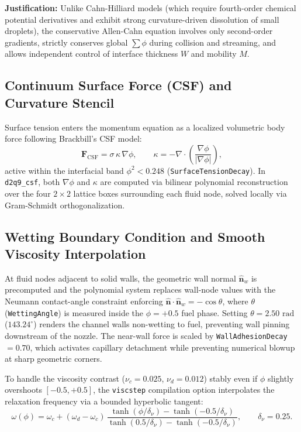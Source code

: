 \documentclass[11pt,a4paper]{article}
\begin{document}
\textbf{Justification:} Unlike Cahn-Hilliard models (which require fourth-order chemical potential derivatives and exhibit strong curvature-driven dissolution of small droplets), the conservative Allen-Cahn equation involves only second-order gradients, strictly conserves global $\sum \phi$ during collision and streaming, and allows independent control of interface thickness $W$ and mobility $M$.

\subsection{Continuum Surface Force (CSF) and Curvature Stencil}

Surface tension enters the momentum equation as a localized volumetric body force following Brackbill's CSF model:
\begin{equation}
    \mathbf{F}_{\mathrm{CSF}} = \sigma\,\kappa\,\nabla\phi, \qquad \kappa = -\nabla \cdot \left( \frac{\nabla\phi}{|\nabla\phi|} \right),
\end{equation}
active within the interfacial band $\phi^2 < 0.248$ (\texttt{SurfaceTensionDecay}). In \texttt{d2q9\_csf}, both $\nabla\phi$ and $\kappa$ are computed via bilinear polynomial reconstruction over the four $2 \times 2$ lattice boxes surrounding each fluid node, solved locally via Gram-Schmidt orthogonalization.

\subsection{Wetting Boundary Condition and Smooth Viscosity Interpolation}

At fluid nodes adjacent to solid walls, the geometric wall normal $\hat{\mathbf{n}}_w$ is precomputed and the polynomial system replaces wall-node values with the Neumann contact-angle constraint enforcing $\hat{\mathbf{n}} \cdot \hat{\mathbf{n}}_w = -\cos\theta$, where $\theta$ (\texttt{WettingAngle}) is measured inside the $\phi = +0.5$ fuel phase. Setting $\theta = 2.50\text{ rad}$ ($143.24^\circ$) renders the channel walls non-wetting to fuel, preventing wall pinning downstream of the nozzle. The near-wall force is scaled by \texttt{WallAdhesionDecay} $= 0.70$, which activates capillary detachment while preventing numerical blowup at sharp geometric corners.

To handle the viscosity contrast ($\nu_c = 0.025$, $\nu_d = 0.012$) stably even if $\phi$ slightly overshoots $[-0.5, +0.5]$, the \texttt{viscstep} compilation option interpolates the relaxation frequency via a bounded hyperbolic tangent:
\begin{equation}
    \omega(\phi) = \omega_c + (\omega_d - \omega_c)\,\frac{\tanh(\phi / \delta_\nu) - \tanh(-0.5 / \delta_\nu)}{\tanh(0.5 / \delta_\nu) - \tanh(-0.5 / \delta_\nu)}, \qquad \delta_\nu = 0.25.
\end{equation}
\end{document}
